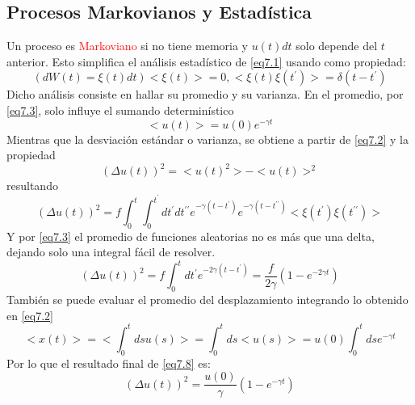 \documentclass{book}
\begin{document}
\subsection{Procesos Markovianos y Estadística}
Un proceso es \textcolor{red}{Markoviano} si no tiene memoria y $u(t)dt$ solo depende del $t$ anterior. Esto simplifica el análisis estadístico de \ref{eq7.1} usando como propiedad:
\begin{equation}\label{eq7.3}(dW(t)=\xi(t)dt) <\xi(t)>=0, <\xi(t)\xi(t^\prime)>=\delta(t-t^\prime) \end{equation}
Dicho análisis consiste en hallar su promedio y su varianza. En el promedio, por \ref{eq7.3}, solo influye el sumando determinístico
\begin{equation}\label{eq7.4}<u(t)>=u(0)e^{-\gamma t}\end{equation}
Mientras que la desviación estándar o varianza, se obtiene a partir de \ref{eq7.2} y la propiedad
\begin{equation}\label{eq7.5}(\Delta u(t))^2=<u(t)^2>-<u(t)>^2\end{equation}
resultando
\begin{equation}\label{eq7.6}(\Delta u(t))^2=f\int_0^t\int_0^{t^\prime}dt^\prime dt^{\prime\prime} e^{-\gamma(t-t^\prime)}e^{-\gamma(t-t^{\prime\prime})}<\xi(t^\prime)\xi(t^{\prime \prime})>\end{equation}
Y por \ref{eq7.3} el promedio de funciones aleatorias no es más que una delta, dejando solo una integral fácil de resolver.
\begin{equation}\label{eq7.7}(\Delta u(t))^2=f\int_0^t dt^\prime e^{-2\gamma(t-t^\prime)}=\frac{f}{2\gamma}(1-e^{-2\gamma t}) \end{equation}
También se puede evaluar el promedio del desplazamiento integrando lo obtenido en \ref{eq7.2}
\begin{equation}\label{eq7.8}<x(t)>=<\int_0^t ds u(s)>=\int_0^t ds <u(s)> =u(0)\int_0^t ds e^{-\gamma t}\end{equation}
Por lo que el resultado final de \ref{eq7.8} es:
\begin{equation}\label{eq7.9} (\Delta u(t))^2=\frac{u(0)}{\gamma}(1-e^{-\gamma t})\end{equation}
\end{document}

